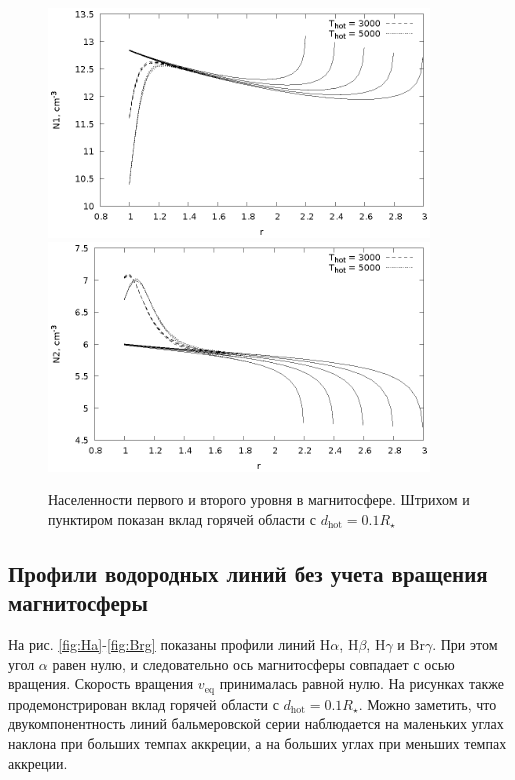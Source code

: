 \documentclass[12pt]{article}
\begin{document}
\begin{figure}[!h]
\centering
\includegraphics[width=0.9\textwidth]{N1.eps}
\includegraphics[width=0.9\textwidth]{N2.eps}
\caption{Населенности первого и второго уровня в магнитосфере. Штрихом и пунктиром показан вклад горячей области с $d_\text{hot} = 0.1 R_\star$}
\label{fig:N1N2}
\end{figure}
\FloatBarrier
\subsection{Профили водородных линий без учета вращения магнитосферы}

На рис. \ref{fig:Ha}-\ref{fig:Brg} показаны профили линий $\text{H}\alpha$, $\text{H}\beta$, $\text{H}\gamma$ и $\text{Br}\gamma$. При этом угол $\alpha$ равен нулю, и следовательно ось магнитосферы совпадает с осью вращения. Скорость вращения $v_\text{eq}$ принималась равной нулю. На рисунках также продемонстрирован вклад горячей области с $d_\text{hot} = 0.1 R_\star$. Можно заметить, что двукомпонентность линий бальмеровской серии наблюдается на маленьких углах наклона при больших темпах аккреции, а на больших углах при меньших темпах аккреции.
\end{document}
